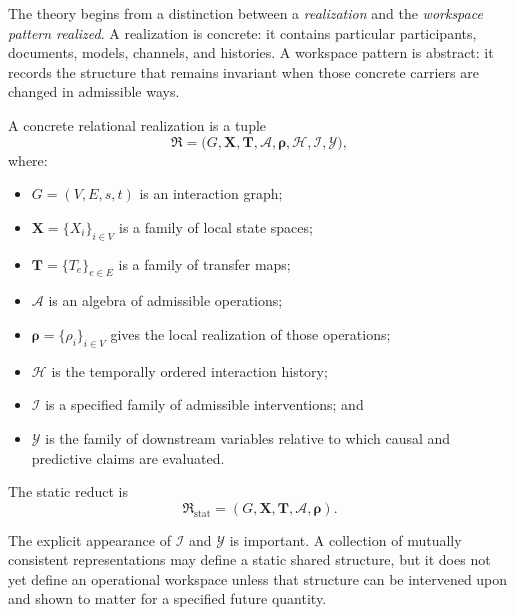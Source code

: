 


The theory begins from a distinction between a \emph{realization} and the
\emph{workspace pattern realized}. A realization is concrete: it contains
particular participants, documents, models, channels, and histories. A
workspace pattern is abstract: it records the structure that remains invariant
when those concrete carriers are changed in admissible ways.

\begin{definition}\label{def:realization}
A concrete relational realization is a tuple
\[
\mathfrak R
=
\bigl(
G,\mathbf X,\mathbf T,\mathcal A,\boldsymbol\rho,
\mathcal H,\mathcal I,\mathcal Y
\bigr),
\]
where:
\begin{itemize}
\item \(G=(V,E,s,t)\) is an interaction graph;
\item \(\mathbf X=\{X_i\}_{i\in V}\) is a family of local state spaces;
\item \(\mathbf T=\{T_e\}_{e\in E}\) is a family of transfer maps;
\item \(\mathcal A\) is an algebra of admissible operations;
\item \(\boldsymbol\rho=\{\rho_i\}_{i\in V}\) gives the local realization of those operations;
\item \(\mathcal H\) is the temporally ordered interaction history;
\item \(\mathcal I\) is a specified family of admissible interventions; and
\item \(\mathcal Y\) is the family of downstream variables relative to which causal and predictive claims are evaluated.
\end{itemize}
The static reduct is
\[
\mathfrak R_{\mathrm{stat}}
=
(G,\mathbf X,\mathbf T,\mathcal A,\boldsymbol\rho).
\]
\end{definition}

The explicit appearance of \(\mathcal I\) and \(\mathcal Y\) is important.
A collection of mutually consistent representations may define a static
shared structure, but it does not yet define an operational workspace unless
that structure can be intervened upon and shown to matter for a specified
future quantity.

